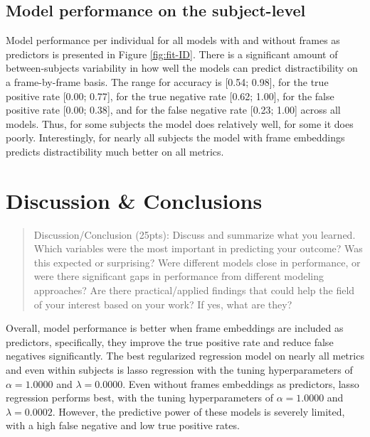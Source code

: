 \documentclass[
  man]{apa6}
\begin{document}
\hypertarget{model-performance-on-the-subject-level}{%
\subsection{Model performance on the subject-level}\label{model-performance-on-the-subject-level}}

Model performance per individual for all models with and without frames as predictors is presented in Figure \ref{fig:fit-ID}. There is a significant amount of between-subjects variability in how well the models can predict distractibility on a frame-by-frame basis. The range for accuracy is {[}0.54; 0.98{]}, for the true positive rate {[}0.00; 0.77{]}, for the true negative rate {[}0.62; 1.00{]}, for the false positive rate {[}0.00; 0.38{]}, and for the false negative rate {[}0.23; 1.00{]} across all models. Thus, for some subjects the model does relatively well, for some it does poorly. Interestingly, for nearly all subjects the model with frame embeddings predicts distractibility much better on all metrics.

\hypertarget{discussion-conclusions}{%
\section{Discussion \& Conclusions}\label{discussion-conclusions}}

\begin{quote}
Discussion/Conclusion (25pts): Discuss and summarize what you learned. Which variables were the most important in predicting your outcome? Was this expected or surprising? Were different models close in performance, or were there significant gaps in performance from different modeling approaches? Are there practical/applied findings that could help the field of your interest based on your work? If yes, what are they?
\end{quote}

Overall, model performance is better when frame embeddings are included as predictors, specifically, they improve the true positive rate and reduce false negatives significantly. The best regularized regression model on nearly all metrics and even within subjects is lasso regression with the tuning hyperparameters of \(\alpha = 1.0000\) and \(\lambda = 0.0000\). Even without frames embeddings as predictors, lasso regression performs best, with the tuning hyperparameters of \(\alpha = 1.0000\) and \(\lambda = 0.0002\). However, the predictive power of these models is severely limited, with a high false negative and low true positive rates.
\end{document}

